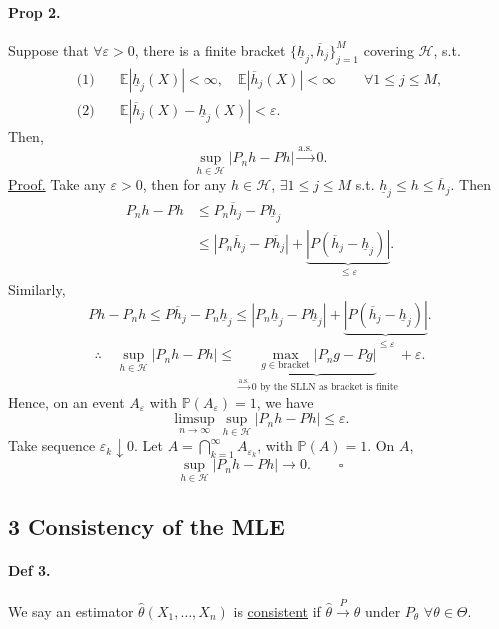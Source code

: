 \documentclass[11pt,a4paper]{article}
\begin{document}
\paragraph{Prop 2.}
Suppose that $\forall\varepsilon>0$, there is a finite bracket
$\{\underline{h}_j,\overline{h}_j\}_{j=1}^M$ covering $\mathcal{H}$, s.t.
\begin{align*}
\text{(1)}\quad&\mathbb{E}|\underline{h}_j(X)|<\infty,\quad
\mathbb{E}|\overline{h}_j(X)|<\infty\qquad\forall 1\leq j\leq M,\\
\text{(2)}\quad&\mathbb{E}|\overline{h}_j(X)-\underline{h}_j(X)|<\varepsilon.
\end{align*}
Then,
\[
\sup_{h\in\mathcal{H}}|P_nh-Ph|\xrightarrow{\mathrm{a.s.}}0.
\]
\noindent\underline{Proof.}
Take any $\varepsilon>0$, then for any $h\in\mathcal{H}$,
$\exists 1\leq j\leq M$ s.t. $\underline{h}_j\leq h\leq\overline{h}_j$.
Then
\[
\begin{aligned}
P_nh-Ph&\leq P_n\overline{h}_j-P\underline{h}_j\\
&\leq |P_n\overline{h}_j-P\overline{h}_j|
+\underbrace{|P(\overline{h}_j-\underline{h}_j)|}_{\leq\varepsilon}.
\end{aligned}
\]
Similarly,
\[
Ph-P_nh\leq P\overline{h}_j-P_n\underline{h}_j
\leq |P_n\underline{h}_j-P\underline{h}_j|
+\underbrace{|P(\overline{h}_j-\underline{h}_j)|}_{\leq\varepsilon}.
\]
\[
\therefore\quad\sup_{h\in\mathcal{H}}|P_nh-Ph|
\leq\underbrace{\max_{g\in\mathrm{bracket}}|P_ng-Pg|}
_{\xrightarrow{\mathrm{a.s.}}0\text{ by the SLLN as bracket is finite}}
+\varepsilon.
\]
Hence, on an event $A_\varepsilon$ with $\mathbb{P}(A_\varepsilon)=1$, we have
\[
\limsup_{n\to\infty}\sup_{h\in\mathcal{H}}|P_nh-Ph|\leq\varepsilon.
\]
Take sequence $\varepsilon_k\downarrow0$. Let
$A=\bigcap_{k=1}^\infty A_{\varepsilon_k}$, with $\mathbb{P}(A)=1$.
On $A$,
\[
\sup_{h\in\mathcal{H}}|P_nh-Ph|\longrightarrow0.\qquad\square
\]

\subsection*{3 Consistency of the MLE}

\paragraph{Def 3.}
We say an estimator $\hat{\theta}(X_1,\ldots,X_n)$ is \underline{consistent}
if $\hat{\theta}\xrightarrow{P}\theta$ under $P_\theta$ $\forall\theta\in\Theta$.
\end{document}
